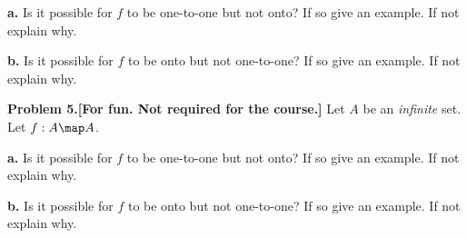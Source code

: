 \documentclass[oneside,12pt]{amsart}
\begin{document}
\smallskip

\textbf{a.} Is it possible for $f$ to be one-to-one but not onto? If so
give an example. If not explain why.

\bigskip
\bigskip

\textbf{b.} Is it possible for $f$ to be onto but not one-to-one? If so
give an example. If not explain why.

\bigskip

\textbf{Problem 5.[For fun. Not required for the course.]} Let $A$ be an \emph{infinite} set.
Let $f : A \map A$.

\smallskip

\textbf{a.} Is it possible for $f$ to be one-to-one but not onto? If so
give an example. If not explain why.

\bigskip
\bigskip

\textbf{b.} Is it possible for $f$ to be onto but not one-to-one? If so
give an example. If not explain why.
\end{document}
